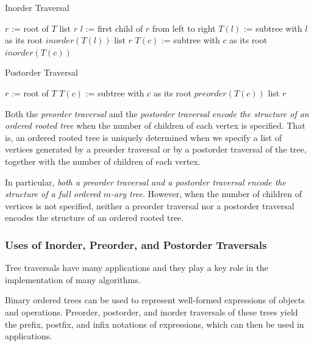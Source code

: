 \documentclass{article}
\begin{document}
\begin{algorithm}
\caption{Inorder Traversal}
\begin{algorithmic}[1]
\State $r$ := root of $T$
 {list $r$}
\Else
\State $l$ := first child of $r$ from left to right
\State $T(l)$ := subtree with $l$ as its root
\State $inorder(T(l))$
\State list $r$
\State $T(c)$ := subtree with $c$ as its root
\State $inorder(T(c))$
\EndFor
\EndIf
\EndProcedure
\end{algorithmic}
\end{algorithm}

\begin{algorithm}[h!]
\caption{Postorder Traversal}
\begin{algorithmic}[1]
\State $r$ := root of $T$
\State $T(c)$ := subtree with $c$ as its root
\State $preorder(T(c))$
\EndFor
\State list $r$
\EndProcedure
\end{algorithmic}
\end{algorithm}


Both the \textit{preorder traversal} and the \textit{postorder traversal} \textit{encode the structure of an ordered rooted tree} when the number of children of each vertex is specified. That is, an ordered rooted tree is uniquely determined when we specify a list of vertices generated by a preorder traversal or by a postorder traversal of the tree, together with the number of children of each vertex. 

In particular, \textit{both a preorder traversal and a postorder traversal encode the structure of a full ordered $m$-ary tree}. However, when the number of children of vertices is not specified, neither a preorder traversal nor a postorder traversal encodes the structure of an ordered rooted tree.

\subsubsection{Uses of Inorder, Preorder, and Postorder Traversals}

Tree traversals have many applications and they play a key role in the implementation of many algorithms. 

Binary ordered trees can be used to represent well-formed expressions of objects and operations. Preorder, postorder, and inorder traversals of these trees yield the prefix, postfix, and infix notations of expressions, which can then be used in applications.
\end{document}
